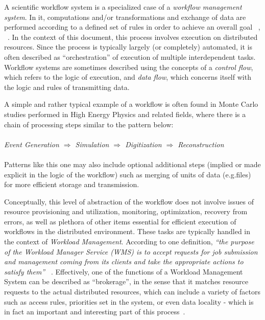 A scientific workflow system is a specialized case of a \textit{workflow management system}. In it, computations and/or transformations and exchange of data are performed according to a defined set of rules
in order to achieve an overall goal ~\cite{grid_workflow_taxonomy}, ~\cite{grid_workflow_fit}. In the context of this document, this process involves execution on distributed resources. Since the process is
typically largely (or completely) automated, it is often described as ``orchestration'' of execution of multiple interdependent tasks. Workflow systems are sometimes described using the concepts of a \textit{control flow},
which refers to the logic of execution, and \textit{data flow}, which concerns itself with the logic and rules of transmitting data.

A simple and rather typical example of a workflow is often found in Monte Carlo studies performed in High Energy Physics and related fields, where there is a chain of processing steps similar to the pattern below:
\\
\\
\textit{Event  Generation $\Longrightarrow$ Simulation $\Longrightarrow$ Digitization $\Longrightarrow$ Reconstruction}
\\
\\
Patterns like this one may also include optional additional steps (implied or made explicit in the logic of the workflow) such as merging of units of data (e.g.files) for more efficient storage and transmission.

Conceptually, this level of abstraction of the workflow does not  involve issues of resource provisioning and utilization, monitoring, optimization, recovery from errors, as well as plethora of other items essential
for efficient execution of workflows in the distributed environment. These tasks are typically handled in the context of \textit{Workload Management}. According to one definition,
\textit{``the purpose of the Workload Manager Service (WMS) is to accept requests for job submission and management coming from its clients and take the appropriate actions to satisfy them''} ~\cite{egee_user_guide}.
Effectively, one of the functions of a Workload Management System can be described as ``brokerage'', in the sense that it matches resource requests to the actual distributed resources, which can include a
variety of factors such as access rules, priorities set in the system, or even data locality - which is in fact an important and interesting part of this process~\cite{panda_chep11}.

